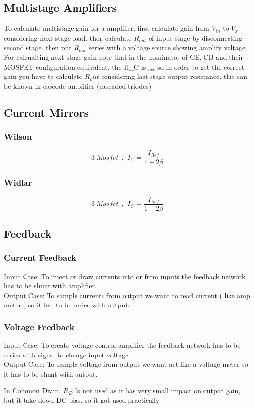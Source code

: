 \subsection{Multistage Amplifiers}
To calculate multistage gain for a amplifier. first calculate gain from $V_{in}$ to $V_x$ considering next stage load. then calculate $R_{out}$ of input stage by disconnecting second stage. then put $R_{out}$ series with a voltage source showing amplify voltage. For calcualting next stage gain note that in the nominator of CE, CB and their MOSFET configuration equivalent, the R_C is $_{out}$ so in order to get the correct gain you have to calculate $R_out$ considering last stage output resistance. this can be known in cascode amplifier (cascaded triodes).

\subsection{Current Mirrors}
\subsubsection{Wilson}
$$ 3~Mosfet ~~ , ~~ I_C = \frac{I_{Ref}}{1 + 2 \beta} $$
\par
\subsubsection{Widlar}
$$ 3~Mosfet ~~ , ~~ I_C = \frac{I_{Ref}}{1 + 2 \beta} $$
\par
\subsection{Feedback}
\subsubsection{Current Feedback}
Input Case: To inject or draw currents into or from inputs the feedback network has to be shunt with amplifier.\\
Output Case: To sample currents from output we want to read current ( like amp meter ) so it has to be series with output.\\
\lipsum[7-8]
\subsubsection{Voltage Feedback}
Input Case: To create voltage control amplifier the feedback network has to be series with signal to change input voltage.\\
Output Case: To sample voltage from output we want act like a voltage meter so it has to be shunt with output.
\par
\setlength{\parindent}{0.5cm} %
In Common Drain, $R_D$ Is not used as it has very small impact on output gain, but it take down DC bias. so it not used practically
\lipsum[1]
\setlength{\parindent}{0.0cm} 
